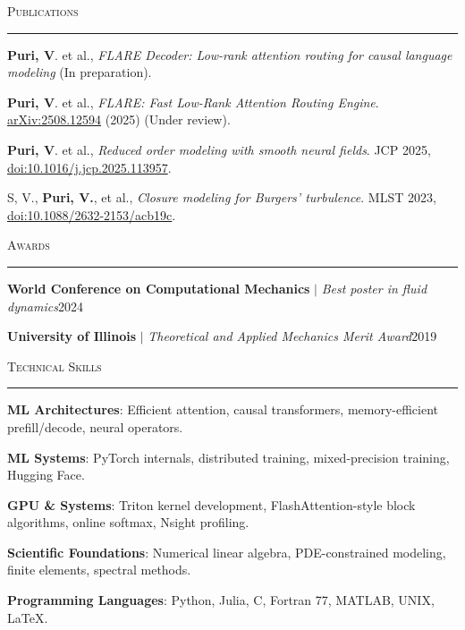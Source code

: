 \documentclass[10pt]{article}
\newcommand{\cvsection}[1]{%
  \vspace{0.25em}%
  {\Large\textsc{#1}}\\[-0.90em]
  \rule{\linewidth}{0.4pt}
  \vspace{-0.10em}
}
\newcommand{\cvrole}[3]{\textbf{#1} $|$ \textit{#2}\hfill #3}
\newcommand{\cvskill}[2]{\textbf{#1}: #2}
\begin{document}



\cvsection{Publications}
\textbf{Puri, V}. et al., \textit{FLARE Decoder: Low-rank attention routing for causal language modeling} (In preparation).

\textbf{Puri, V}. et al., \textit{FLARE: Fast Low-Rank Attention Routing Engine}. \href{https://arxiv.org/abs/2508.12594}{arXiv:2508.12594} (2025) (Under review).

\textbf{Puri, V}. et al., \textit{Reduced order modeling with smooth neural fields}. JCP 2025, \href{https://doi.org/10.1016/j.jcp.2025.113957}{doi:10.1016/j.jcp.2025.113957}.

S, V., \textbf{Puri, V.}, et al., \textit{Closure modeling for Burgers' turbulence}. MLST 2023, \href{https://doi.org/10.1088/2632-2153/acb19c}{doi:10.1088/2632-2153/acb19c}.

\cvsection{Awards}
\cvrole{World Conference on Computational Mechanics}{Best poster in fluid dynamics}{2024}

\cvrole{University of Illinois}{Theoretical and Applied Mechanics Merit Award}{2019}



\cvsection{Technical Skills}
\cvskill{ML Architectures}{Efficient attention, causal transformers, memory-efficient prefill/decode, neural operators.}

\cvskill{ML Systems}{PyTorch internals, distributed training, mixed-precision training, Hugging Face.}

\cvskill{GPU \& Systems}{Triton kernel development, FlashAttention-style block algorithms, online softmax, Nsight profiling.}

\cvskill{Scientific Foundations}{Numerical linear algebra, PDE-constrained modeling, finite elements, spectral methods.}

\cvskill{Programming Languages}{Python, Julia, C, Fortran 77, MATLAB, UNIX, \LaTeX.}

\end{document}

